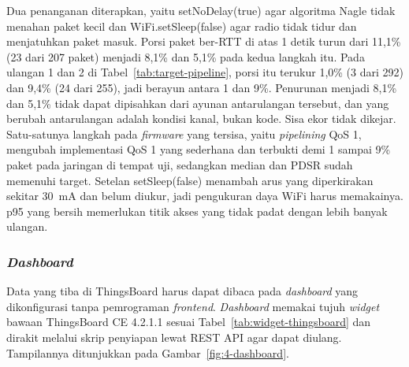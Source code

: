 Dua penanganan diterapkan, yaitu setNoDelay(true) agar algoritma Nagle tidak menahan paket kecil dan WiFi.setSleep(false) agar radio tidak tidur dan menjatuhkan paket masuk. Porsi paket ber-RTT di atas 1 detik turun dari 11,1\% (23 dari 207 paket) menjadi 8,1\% dan 5,1\% pada kedua langkah itu. Pada ulangan 1 dan 2 di Tabel~\ref{tab:target-pipeline}, porsi itu terukur 1,0\% (3 dari 292) dan 9,4\% (24 dari 255), jadi berayun antara 1 dan 9\%. Penurunan menjadi 8,1\% dan 5,1\% tidak dapat dipisahkan dari ayunan antarulangan tersebut, dan yang berubah antarulangan adalah kondisi kanal, bukan kode. Sisa ekor tidak dikejar. Satu-satunya langkah pada \textit{firmware} yang tersisa, yaitu \textit{pipelining} QoS 1, mengubah implementasi QoS 1 yang sederhana dan terbukti demi 1 sampai 9\% paket pada jaringan di tempat uji, sedangkan median dan PDSR sudah memenuhi target. Setelan setSleep(false) menambah arus yang diperkirakan sekitar 30~mA dan belum diukur, jadi pengukuran daya WiFi harus memakainya. p95 yang bersih memerlukan titik akses yang tidak padat dengan lebih banyak ulangan.

\subsubsection{\textit{Dashboard}}

Data yang tiba di ThingsBoard harus dapat dibaca pada \textit{dashboard} yang dikonfigurasi tanpa pemrograman \textit{frontend}. \textit{Dashboard} memakai tujuh \textit{widget} bawaan ThingsBoard CE 4.2.1.1 sesuai Tabel~\ref{tab:widget-thingsboard} dan dirakit melalui skrip penyiapan lewat REST API agar dapat diulang. Tampilannya ditunjukkan pada Gambar~\ref{fig:4-dashboard}.

